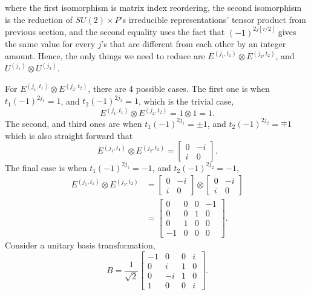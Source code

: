 \documentclass[preprint, 12pt]{revtex4-2}
\numberwithin{equation}{section}
\begin{document}
where the first isomorphism is matrix index reordering, the second isomorphism is the reduction of $SU(2)\times P$'s irreducible representations' tensor product from previous section, and the second equality uses the fact that $(-1)^{2j\left\lfloor \tau/2\right\rfloor}$ gives the same value for every $j$'s that are different from each other by an integer amount. Hence, the only things we need to reduce are $E^{(j_1,t_1)}\otimes E^{(j_2,t_2)}$, and $U^{(j_1)}\otimes U^{(j_2)}$.

For $E^{(j_1,t_1)}\otimes E^{(j_2,t_2)}$, there are 4 possible cases. The first one is when $t_1(-1)^{2j_1}=1$, and $t_2(-1)^{2j_2}=1$, which is the trivial case,
\begin{equation}
    E^{(j_1,t_1)}\otimes E^{(j_2,t_2)} = 1\otimes 1 = 1.
\end{equation}
The second, and third ones are when $t_1(-1)^{2j_1}=\pm 1$, and $t_2(-1)^{2j_2}=\mp 1$ which is also straight forward that
\begin{equation}
    E^{(j_1,t_1)}\otimes E^{(j_2,t_2)} = \begin{bmatrix}0&-i\\i&0\end{bmatrix}.
\end{equation}
The final case is when $t_1(-1)^{2j_1}=-1$, and $t_2(-1)^{2j_2}=-1$,
\begin{equation}
    \begin{aligned}
        E^{(j_1,t_1)}\otimes E^{(j_2,t_2)} &= \begin{bmatrix}0&-i\\i&0\end{bmatrix}\otimes \begin{bmatrix}0&-i\\i&0\end{bmatrix} \\
        &=  \begin{bmatrix}
                0 & 0 & 0 &-1 \\
                0 & 0 & 1 & 0 \\
                0 & 1 & 0 & 0 \\
               -1 & 0 & 0 & 0
            \end{bmatrix}.
    \end{aligned}
\end{equation}
Consider a unitary basis transformation,
\begin{equation}
    B = \dfrac{1}{\sqrt{2}}\begin{bmatrix}
       -1 & 0 & 0 & i \\
        0 & i & 1 & 0 \\
        0 &-i & 1 & 0 \\
        1 & 0 & 0 & i
    \end{bmatrix}.
\end{equation}
\end{document}

